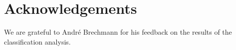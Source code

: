 \section*{Acknowledgements}

We are grateful to Andr\'e Brechmann for his feedback on the results of the
classification analysis.

{\small
  
}%


